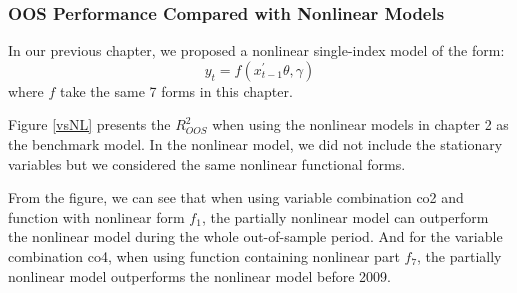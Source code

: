\documentclass[a4paper,12pt,times,numbered,print,index]{report}
\numberwithin{equation}{section}
\begin{document}
\subsubsection{OOS Performance Compared with Nonlinear Models}

In our previous chapter, we proposed a nonlinear single-index model of the form:
$$
y_t = f\left( x_{t-1}^{\prime}\theta,\gamma \right)
$$
where $f$ take the same 7 forms in this chapter.

Figure \ref{vsNL} presents the $R^2_{OOS}$ when using the nonlinear models in chapter 2 as the benchmark model. In the nonlinear model, we did not include the stationary variables but we considered the same nonlinear functional forms. 

From the figure, we can see that when using variable combination co2 and function with nonlinear form $f_1$, the partially nonlinear model can outperform the nonlinear model during the whole out-of-sample period. And for the variable combination co4, when using function containing nonlinear part $f_7$, the partially nonlinear model outperforms the nonlinear model before 2009. 
\end{document}
